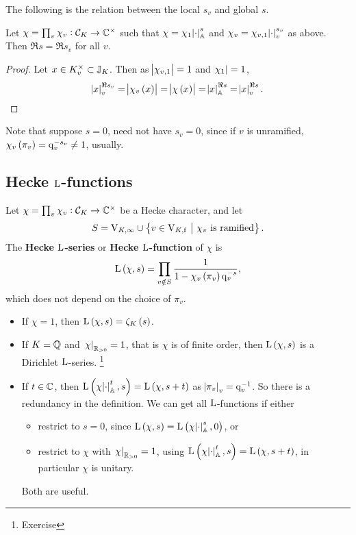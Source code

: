 The following is the relation between the local $ s_v $ and global $ s $.

\begin{proposition}
Let $ \chi = \prod_v \chi_v : \mathcal{C}_K \to \mathbb{C}^\times $ such that $ \chi = \chi_1\abs{\cdot}_{\mathbb{A}}^s $ and $ \chi_v = \chi_{v, 1}\abs{\cdot}_v^{s_v} $ as above. Then $ \Re s = \Re s_v $ for all $ v $.
\end{proposition}

\begin{proof}
Let $ x \in K_v^\times \subset \mathbb{J}_K $. Then as $ \abs{\chi_{v, 1}} = 1 $ and $ \abs{\chi_1} = 1 $,
$$ \abs{x}_v^{\Re s_v} = \abs{\chi_v\br{x}} = \abs{\chi\br{x}} = \abs{x}_\AA^{\Re s} = \abs{x}_v^{\Re s}. $$
\end{proof}

Note that suppose $ s = 0 $, need not have $ s_v = 0 $, since if $ v $ is unramified, $ \chi_v\br{\pi_v} = \q_v^{-s_v} \ne 1 $, usually.

\pagebreak

\subsection{Hecke \texorpdfstring{$ \mathrm{L} $}{L}-functions}

\begin{definition*}
Let $ \chi = \prod_v \chi_v : \mathcal{C}_K \to \mathbb{C}^\times $ be a Hecke character, and let
$$ S = \V_{K, \infty} \cup \cbr{v \in \V_{K, \f} \st \chi_v \ \text{is ramified}}. $$
The \textbf{Hecke $ \mathrm{L} $-series} or \textbf{Hecke $ \mathrm{L} $-function} of $ \chi $ is
$$ \L\br{\chi, s} = \prod_{v \notin S} \dfrac{1}{1 - \chi_v\br{\pi_v}\q_v^{-s}}, $$
which does not depend on the choice of $ \pi_v $.
\end{definition*}

\begin{remark*}
\hfill
\begin{itemize}
\item If $ \chi = 1 $, then $ \L\br{\chi, s} = \zeta_K\br{s} $.
\item If $ K = \mathbb{Q} $ and $ \left. \chi \right|_{\mathbb{R}_{> 0}} = 1 $, that is $ \chi $ is of finite order, then $ \L\br{\chi, s} $ is a Dirichlet $ \mathrm{L} $-series. \footnote{Exercise}
\item If $ t \in \mathbb{C} $, then $ \L\br{\chi\abs{\cdot}_\AA^t, s} = \L\br{\chi, s + t} $ as $ \abs{\pi_v}_v = \mathrm{q}_v^{-1} $. So there is a redundancy in the definition. We can get all $ \mathrm{L} $-functions if either
\begin{itemize}
\item restrict to $ s = 0 $, since $ \L\br{\chi, s} = \L\br{\chi\abs{\cdot}_\AA^s, 0} $, or
\item restrict to $ \chi $ with $ \left. \chi \right|_{\mathbb{R}_{> 0}} = 1 $, using $ \L\br{\chi\abs{\cdot}_\AA^t, s} = \L\br{\chi, s + t} $, in particular $ \chi $ is unitary.
\end{itemize}
Both are useful.
\end{itemize}
\end{remark*}

